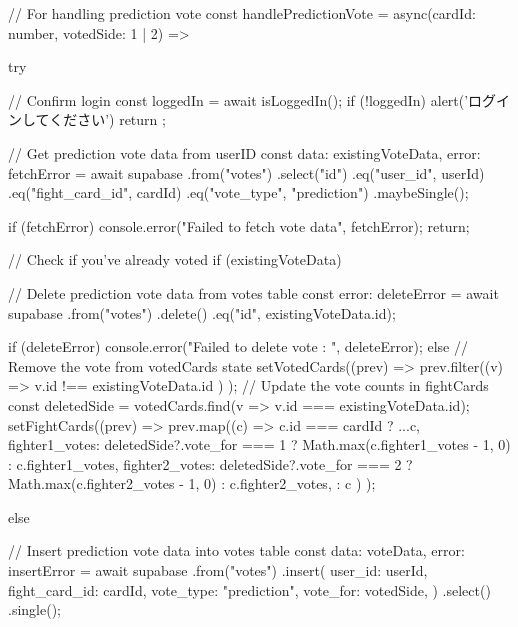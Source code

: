   // For handling prediction vote
  const handlePredictionVote = async(cardId: number, votedSide: 1 | 2) => {
    try {
      // Confirm login
      const loggedIn = await isLoggedIn();
      if (!loggedIn) {
        alert('ログインしてください')
        return
      };

      // Get prediction vote data from userID
      const { data: existingVoteData, error: fetchError } = await supabase
        .from("votes")
        .select("id")
        .eq("user_id", userId)
        .eq("fight_card_id", cardId)
        .eq("vote_type", "prediction")
        .maybeSingle();

      if (fetchError) {
        console.error("Failed to fetch vote data", fetchError);
        return;
      }

      // Check if you've already voted
      if (existingVoteData) {
        // Delete prediction vote data from votes table
        const { error: deleteError } = await supabase
          .from("votes")
          .delete()
          .eq("id", existingVoteData.id);

        if (deleteError) {
          console.error("Failed to delete vote : ", deleteError);
        } else {
          // Remove the vote from votedCards state
          setVotedCards((prev) => 
            prev.filter((v) => 
              v.id !== existingVoteData.id
            )
          );
          // Update the vote counts in fightCards
          const deletedSide = votedCards.find(v => v.id === existingVoteData.id);
          setFightCards((prev) =>
            prev.map((c) =>
              c.id === cardId
                ? {
                    ...c,
                    fighter1_votes:
                      deletedSide?.vote_for === 1 ? Math.max(c.fighter1_votes - 1, 0) : c.fighter1_votes,
                    fighter2_votes:
                      deletedSide?.vote_for === 2 ? Math.max(c.fighter2_votes - 1, 0) : c.fighter2_votes,
                  }
                : c
            )
          );
        }
      } else {
        // Insert prediction vote data into votes table
        const { data: voteData, error: insertError } = await supabase
        .from("votes")
        .insert({
          user_id: userId,
          fight_card_id: cardId,
          vote_type: "prediction",
          vote_for: votedSide,
        })
        .select()
        .single();

}}}
